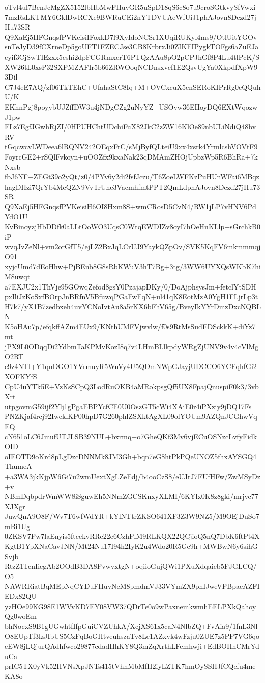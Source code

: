 oTvl4ul7BenJcMgZX5152lbHbMwFHuvGR5uSpD18qS6c8o7u9croSGtkvySfVwxi
7mzRsLKTMY6GklDwRCXe9BWRuCEi2nYTDVUAeWfUiJ1phAJovn8Dezd27jHu73SR
Q9XaEj5HFGnqsfPVKeisiIFoxkD7l9XyIdoNCSr1XUqiRUKyl4ms9/OtlUitYGOv
snTeJyD39fCXrneDp5goUFT1FZECJse3CB8KrbrxJi0ZIKFIPygkTOFgs6aZuEJa
cyif3CjSwTIEzxx5cshi2dpFCGRmxerT6PTQzAAu8pO2pCPJhGf8P4Lu4tlPcK/S
XW26tL0xsP32SXPMZAFIr5b66ZRWOoqNCDnsxvcf1E2QsvUgYa0XkpdfXpW93Dil
C7J4eE7AQ/zf06TkTEhC+UfahaStC8Iq+M+OVCxcuX5enSERoKIPrRg0cQQuhU/K
EKhnPgj8poyybUJZffDW3u4jNDgCZg2uNyYZ+USOvw36EIIoyDQ6EXtWqozwJ1pw
FLz7EgfJGwhRjZI/0HPUHChtUDchiFuX82JkC2zZW16KlOe89nbULiNdiQ48bvRV
tGqcwcvLWDeea6lRQNV242OEqxFrC/sMjByfQLteiU9xx4xsrk4YrmlcshVOVtF9
FoyrcGE2+rSQlFvkoyn+uOOZfx9kxaNak23qDMAmZHOjUpbzWp5R6BhRa+7kNxsb
fbJ6NF+ZEGt39o2yQt/z0/4PYv6y2di2fsfJczu/T6ZoeLWFKzPuHUnWFai6MBqz
hagDHzi7QrYb4MeQZN9VvTrUhe3VacmhfmtPPT2QmLdphAJovn8Dezd27jHu73SR
Q9XaEj5HFGnqsfPVKeisiH6OI8Hxm8S+wmCRosD5CvN4/RW1jLP7vHNV6PdYdO1U
KvBinoyzjHbDDfk0aLLtOoWO3UqsC0WtqEWDIZv8oyI7hOeHnKLlp+sGrchkB0iP
wvqJvZeNl+vm2orGfT5/ejLZ2BxJqLCrUJ9YaykQZpOv/SVK5KqFV6mkmmmqjO91
xyjcUmd7dEoHhw+PjBEnb8G8sRbKWuV3hT7Bg+3tg/3WW6UYXQsWKbK7hiM8uwqt
a7EXJU2x1ThVje95GOwqZefod8gsY0PzajapDKy/0/DoAjphsysJm+fetclYtSDH
pxIliJzKoSxfBOrpJnBRfnV5BfuwqPGaFwFqN+ul41qK8EotMzA0YgH1FLjrLp3t
H7k7/yX1B7zedbxeh4uvYCNoIvtAu8a5rKX6bFhV65g/BveyIkYYrDmzDxcNQBLN
K5oHAu7p/efqkffAZm4EUx9/KNthUMFVjwvlw/f0s9RtMsSudEDSckkK+diYz7mt
jPX9L0ODqqDi2YdbmTaKPMvKozI8q7v4LHmBLlkpdyWRgZjUNV9v4v4cVlMgO2RT
e9z4NTl+Y1qnDGO1YVrmuyR5WnVy4U5QDmNWpGJayjUDCCO6YCFqhfGi2XOFKYfS
CpU4uYTk5E+VzKsSCpQ3LodRuOKB4aMRokpsgQf5UX8FpajQnuspiF0k3/3vbXrt
utpgovmG59ijf2Ylj1gPgaEBPYcfCE0U0OszGT5cWi4XAiE0r4iPXziy9jDQ17Fs
PNZKjaf4rcj92IweklKP00hpD7G260phlZSXktAgXL09olYOUm9AZQnJCGhwVqEQ
cN651oLC6JmufUTJLSB39NUL+bxrmq+o7GheQKf3Mv6vjECuOSNzcLvfyFidkOID
oIEOTD9oKrd8pLgDzcDNNMk8JM3Gh+bqn7eG8htPkPQeUNOZ5fhxAYSGQ4ThumeA
+a3WA3jkKjpW6Gi7u2wmUextXgLZeEdj/b4ooCzS8/eUJrJ7FUfHFw/ZwMSyDz+v
NBmDqbpdrWmWW8iSguwEh5NNmZGCSKnxyXLMI/6KYlx0K8z8gki/mrjvc77XJXgr
JuwQnA9O8F/Wv7T6wfWdYR+kYlNTtrZKSO641XF3Z3W9NZ5/M9OEjDuSo7mBi1Ug
0ZKSV7Pw7laEnyis5ftcekvRRe22e6CzhPlM9RLKQX22QCjioQ5nQ7DbK6ftPt4X
KgtB1YpXNaCavJNN/Mt24Nu17I94h2IyK2u4Wdo20R5Gc9h+MWBwN6y6sihGSvjb
RtzZ1TcnIiegAb2OOdB3DA8PvwvxtgN+oqiioGujQWi1PXuXdqaieb5FJGLCQ/O5
NAWRRiatBqMEpNqCYDuFHuvNeM8pmdmVJ33VYmZX9pnIJweVPBpaeAZFIEDx82QU
yzHOe99KG98E1WVvKD7EY08VW37QDrTe0o9wPaxnemkwmhEELPXkQahoyQg0woEm
bhNocxS9B1gUGwhtfIfpGuiCVZUhkA/XcjXS61x5caN4NlbZQ+FvAia9/1fnL3Nl
O8EUpTf3lzJIbUS5CzFqBoGHtveuhszaTv8Le1AZxvk4wFzju0ZUE7z5PP7VG6qo
eEW8jLQjurQAdhfwco29877cdadHhKY8Q3mZqXrthLFemhwji+EdBOHnCMrYduCa
prIC5TX0yVk52HVNsXpJNTs415tVhhMbMfH2iyLZTK7hmOySSHJfCQefu4meKA8o
